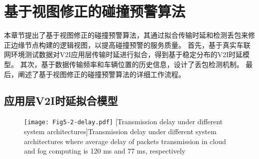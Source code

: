 \section{基于视图修正的碰撞预警算法}\label{section 5-3}

本章节提出了基于视图修正的碰撞预警算法，其通过拟合传输时延和检测丢包来修正边缘节点构建的逻辑视图，以提高碰撞预警的服务质量。
首先，基于真实车联网环境测试数据对V2I应用层传输时延进行拟合，得到基于稳定分布的V2I时延模型。
其次，基于数据传输频率和车辆位置的历史信息，设计了丢包检测机制。
最后，阐述了基于视图修正的碰撞预警算法的详细工作流程。

\subsection{应用层V2I时延拟合模型}

\begin{figure}[h]
\centering
  \texttt{[image: Fig5-2-delay.pdf]}
  [Transmission delay under different system architectures]{Transmission delay under different system architectures where average delay of packets transmission in cloud and fog computing is 120 ms and 77 ms, respectively}
  \label{fig 5-2}
\end{figure}

